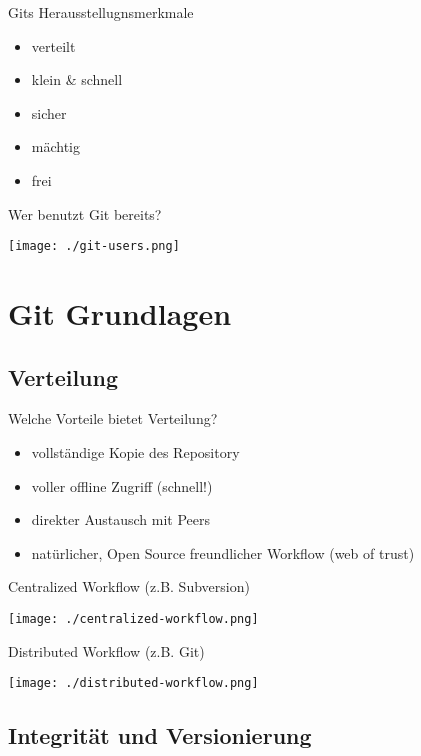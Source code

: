 \begin{frame}{Gits Herausstellugnsmerkmale}
    \begin{itemize}[<+->]
        \item \alert<6>{verteilt}
        \item klein \& schnell
        \item \alert<6>{sicher}
        \item \alert<6>{mächtig}
        \item frei
    \end{itemize}
\end{frame}

\begin{frame}{Wer benutzt Git bereits?}
    \centerline{\texttt{[image: ./git-users.png]}}
\end{frame}

\section{Git Grundlagen}

\subsection{Verteilung}

\begin{frame}{Welche Vorteile bietet Verteilung?}
    \begin{itemize}[<+->]
        \item vollständige Kopie des Repository
        \item voller offline Zugriff (schnell!)
        \item direkter Austausch mit Peers
        \item natürlicher, Open Source freundlicher Workflow (web of trust)
    \end{itemize}
\end{frame}


\begin{frame}{Centralized Workflow (z.B. Subversion)}
    \centerline{\texttt{[image: ./centralized-workflow.png]}}
\end{frame}

\begin{frame}{Distributed Workflow (z.B. Git)}
    \centerline{\texttt{[image: ./distributed-workflow.png]}}
\end{frame}

\subsection{Integrität und Versionierung}

